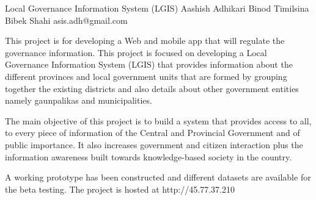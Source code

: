  \begin{conf-abstract}[]
 {Local Governance Information System (LGIS)}
 {Aashish Adhikari
 	Binod Timilsina
 	Bibek Shahi
 }
{asis.adh@gmail.com}

This project is for developing a Web and mobile app that will regulate the governance information. This project is focused on developing a Local Governance Information System (LGIS) that provides information about the different provinces and local government units that are formed by grouping together the existing districts and also details about other government entities namely gaunpalikas and municipalities.

The main objective of this project is to build a system that provides access to all, to every piece of information of the Central and Provincial Government and of public importance. It also increases government and citizen interaction plus the information awareness built towards knowledge-based society in the country.

A working prototype has been constructed and different datasets are available for the beta testing. The project is hosted at http://45.77.37.210 
 \end{conf-abstract}